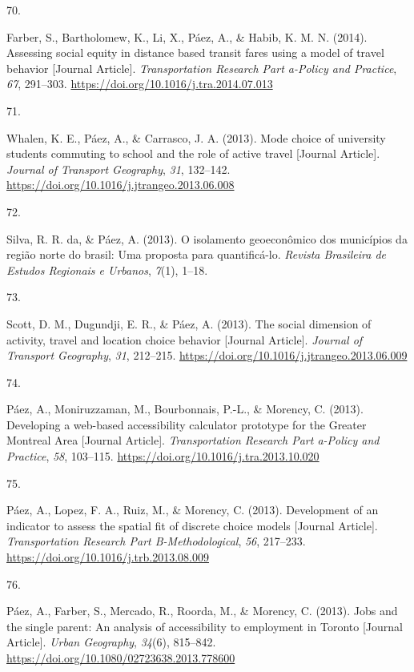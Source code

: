 \documentclass[11pt,a4paper,]{awesome-cv}
\newlength{\cslhangindent}
\newlength{\csllabelwidth}
\newenvironment{CSLReferences}[2] %
 {\begin{list}{}{%
  \setlength{\itemindent}{0pt}
  \setlength{\leftmargin}{0pt}
  \setlength{\parsep}{0pt}
  \ifodd #1
   \setlength{\leftmargin}{\cslhangindent}
   \setlength{\itemindent}{-1\cslhangindent}
  \fi
  \setlength{\itemsep}{#2\baselineskip}}}
 {\end{list}}
\newcommand{\CSLLeftMargin}[1]{\parbox[t]{\csllabelwidth}{\strut#1\strut}}
\newcommand{\CSLRightInline}[1]{\parbox[t]{\linewidth - \csllabelwidth}{\strut#1\strut}}
\begin{document}
\begin{CSLReferences}{0}{0}
\CSLLeftMargin{70. }%
\CSLRightInline{Farber, S., Bartholomew, K., Li, X., Páez, A., \& Habib,
K. M. N. (2014). Assessing social equity in distance based transit fares
using a model of travel behavior {[}Journal Article{]}.
\emph{Transportation Research Part a-Policy and Practice}, \emph{67},
291--303. \url{https://doi.org/10.1016/j.tra.2014.07.013}}

\CSLLeftMargin{71. }%
\CSLRightInline{Whalen, K. E., Páez, A., \& Carrasco, J. A. (2013). Mode
choice of university students commuting to school and the role of active
travel {[}Journal Article{]}. \emph{Journal of Transport Geography},
\emph{31}, 132--142.
\url{https://doi.org/10.1016/j.jtrangeo.2013.06.008}}

\CSLLeftMargin{72. }%
\CSLRightInline{Silva, R. R. da, \& Páez, A. (2013). O isolamento
geoeconômico dos municípios da região norte do brasil: Uma proposta para
quantificá-lo. \emph{Revista Brasileira de Estudos Regionais e Urbanos},
\emph{7}(1), 1--18.}

\CSLLeftMargin{73. }%
\CSLRightInline{Scott, D. M., Dugundji, E. R., \& Páez, A. (2013). The
social dimension of activity, travel and location choice behavior
{[}Journal Article{]}. \emph{Journal of Transport Geography}, \emph{31},
212--215. \url{https://doi.org/10.1016/j.jtrangeo.2013.06.009}}

\CSLLeftMargin{74. }%
\CSLRightInline{Páez, A., Moniruzzaman, M., Bourbonnais, P.-L., \&
Morency, C. (2013). Developing a web-based accessibility calculator
prototype for the Greater Montreal Area {[}Journal Article{]}.
\emph{Transportation Research Part a-Policy and Practice}, \emph{58},
103--115. \url{https://doi.org/10.1016/j.tra.2013.10.020}}

\CSLLeftMargin{75. }%
\CSLRightInline{Páez, A., Lopez, F. A., Ruiz, M., \& Morency, C. (2013).
Development of an indicator to assess the spatial fit of discrete choice
models {[}Journal Article{]}. \emph{Transportation Research Part
B-Methodological}, \emph{56}, 217--233.
\url{https://doi.org/10.1016/j.trb.2013.08.009}}

\CSLLeftMargin{76. }%
\CSLRightInline{Páez, A., Farber, S., Mercado, R., Roorda, M., \&
Morency, C. (2013). Jobs and the single parent: An analysis of
accessibility to employment in Toronto {[}Journal Article{]}.
\emph{Urban Geography}, \emph{34}(6), 815--842.
\url{https://doi.org/10.1080/02723638.2013.778600}}


\end{CSLReferences}
\end{document}
